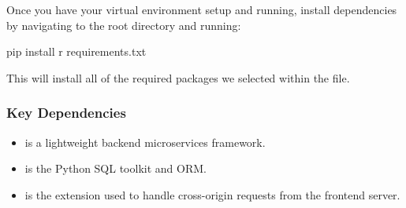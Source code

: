 \documentclass[letterpaper,10pt,english]{sphinxmanual}
\begin{document}
\begin{sphinxVerbatim}[commandchars=\\\{\}]
              


 
\end{sphinxVerbatim}

Once you have your virtual environment setup and running, install dependencies by navigating to the root directory and running:

\begin{sphinxVerbatim}[commandchars=\\\{\}]
pip install \PYGZhy{}r requirements.txt
\end{sphinxVerbatim}

This will install all of the required packages we selected within the  file.


\subsubsection{Key Dependencies}
\label{\detokenize{index:key-dependencies}}\begin{itemize}
\item {} 
  is a lightweight backend microservices framework.

\item {} 
 is the Python SQL toolkit and ORM.

\item {} 
 is the extension used to handle cross-origin requests from the frontend server.

\end{itemize}
\end{document}
